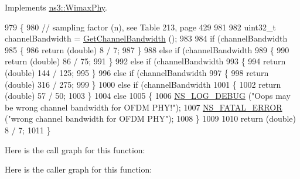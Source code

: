 Implements \hyperlink{classns3_1_1WimaxPhy_a919ad33ecebb052d8794596c2de72376}{ns3\+::\+Wimax\+Phy}.


\begin{DoxyCode}
979 \{
980   \textcolor{comment}{// sampling factor (n), see Table 213, page 429}
981 
982   uint32\_t channelBandwidth = \hyperlink{classns3_1_1WimaxPhy_a701650940d220ad625c30a08c06e85e5}{GetChannelBandwidth} ();
983 
984   \textcolor{keywordflow}{if} (channelBandwidth %
985     \{
986       \textcolor{keywordflow}{return} (\textcolor{keywordtype}{double}) 8 / 7;
987     \}
988   \textcolor{keywordflow}{else} \textcolor{keywordflow}{if} (channelBandwidth %
989     \{
990       \textcolor{keywordflow}{return} (\textcolor{keywordtype}{double}) 86 / 75;
991     \}
992   \textcolor{keywordflow}{else} \textcolor{keywordflow}{if} (channelBandwidth %
993     \{
994       \textcolor{keywordflow}{return} (\textcolor{keywordtype}{double}) 144 / 125;
995     \}
996   \textcolor{keywordflow}{else} \textcolor{keywordflow}{if} (channelBandwidth %
997     \{
998       \textcolor{keywordflow}{return} (\textcolor{keywordtype}{double}) 316 / 275;
999     \}
1000   \textcolor{keywordflow}{else} \textcolor{keywordflow}{if} (channelBandwidth %
1001     \{
1002       \textcolor{keywordflow}{return} (\textcolor{keywordtype}{double}) 57 / 50;
1003     \}
1004   \textcolor{keywordflow}{else}
1005     \{
1006       \hyperlink{group__logging_ga413f1886406d49f59a6a0a89b77b4d0a}{NS\_LOG\_DEBUG} (\textcolor{stringliteral}{"Oops may be wrong channel bandwidth for OFDM PHY!"});
1007       \hyperlink{group__fatal_ga5131d5e3f75d7d4cbfd706ac456fdc85}{NS\_FATAL\_ERROR} (\textcolor{stringliteral}{"wrong channel bandwidth for OFDM PHY"});
1008     \}
1009 
1010   \textcolor{keywordflow}{return} (\textcolor{keywordtype}{double}) 8 / 7;
1011 \}
\end{DoxyCode}


Here is the call graph for this function\+:




Here is the caller graph for this function\+:


